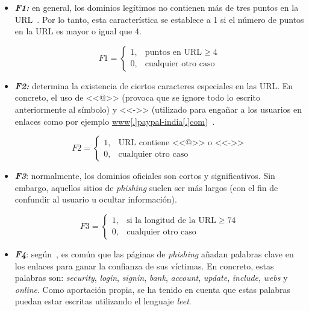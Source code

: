 \begin{itemize}
	\item \textit{\textbf{F1:}} en general, los dominios legítimos no contienen más de tres puntos en la URL~\cite{featuresPhishing2018Gupta}. Por lo tanto, esta característica se establece a 1 si el número de puntos en la URL es mayor o igual que 4.
	
	\[F1 = \left\{ \begin{array}{lr} 1, & \text{puntos en URL} \ge 4\\ 
		0, & \text{cualquier otro caso} \label{eqn:phishing_f1} \end{array} \right. \] 
	
	\item \textit{\textbf{F2:}} determina la existencia de ciertos caracteres especiales en las URL. En concreto, el uso de <<@>> (provoca que se ignore todo lo escrito anteriormente al símbolo) y <<->> (utilizado para engañar a los usuarios en enlaces como por ejemplo \url{www[.]paypal-india[.]com})~\cite{featuresPhishing2018Gupta}.
	
	\[F2 = \left\{ \begin{array}{lr} 1, & \text{URL contiene <<@>> o <<->>}\\ 
		0, & \text{cualquier otro caso} \label{eqn:phishing_f2} \end{array} \right. \]
	
	\item \textit{\textbf{F3}}: normalmente, los dominios oficiales son cortos y significativos. Sin embargo, aquellos sitios de \textit{phishing} suelen ser más largos (con el fin de confundir al usuario u ocultar información).
	
	\[F3 = \left\{ \begin{array}{lr} 1, & \text{si la longitud de la URL} \ge 74\\ 
		0, & \text{cualquier otro caso} \label{eqn:phishing_f3} \end{array} \right. \]
	
	\item \textit{\textbf{F4}}: según~\cite{featuresPhishing2018Gupta}, es común que las páginas de \textit{phishing} añadan palabras clave en los enlaces para ganar la confianza de sus víctimas. En concreto, estas palabras son: \textit{security}, \textit{login}, \textit{signin}, \textit{bank}, \textit{account}, \textit{update}, \textit{include}, \textit{webs} y \textit{online}. Como aportación propia, se ha tenido en cuenta que estas palabras puedan estar escritas utilizando el lenguaje \textit{leet}.
	

\end{itemize}
